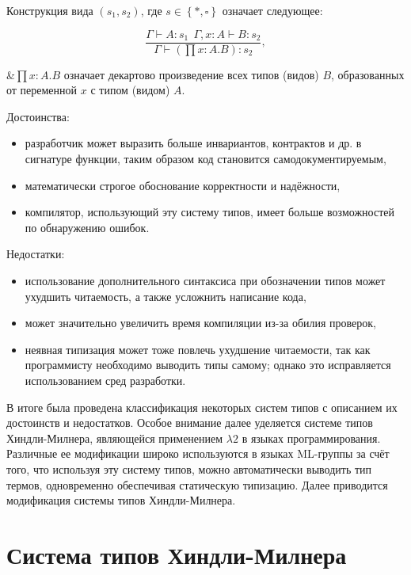 Конструкция вида $(s_1, s_2)$, где $s \in \left\{ *, \square \right\}$ означает следующее:

\begin{equation}
    \label{eq:type_system_rules}
    \frac{
        \Gamma \vdash A: s_1 ~~ \Gamma, x: A \vdash B: s_2
    }{
        \Gamma \vdash (\prod x: A. B): s_2
    },
\end{equation}
\begin{eqrem}
    &$\prod x: A. B$ означает декартово произведение всех типов (видов) $B$, образованных от переменной $x$ с типом (видом) $A$.
\end{eqrem}

Достоинства:
\begin{itemize}
    \item разработчик может выразить больше инвариантов, контрактов и др. в сигнатуре функции, таким образом код становится самодокументируемым,
    \item математически строгое обоснование корректности и надёжности,
    \item компилятор, использующий эту систему типов, имеет больше возможностей по обнаружению ошибок.
\end{itemize}

Недостатки:
\begin{itemize}
    \item использование дополнительного синтаксиса при обозначении типов может ухудшить читаемость, а также усложнить написание кода,
    \item может значительно увеличить время компиляции из-за обилия проверок,
    \item неявная типизация может тоже повлечь ухудшение читаемости, так как программисту необходимо выводить типы самому; однако это исправляется использованием сред разработки.
\end{itemize}

В итоге была проведена классификация некоторых систем типов с описанием их достоинств и недостатков.
Особое внимание далее уделяется системе типов Хиндли-Милнера, являющейся применением $\lambda 2$ в языках программирования.
Различные ее модификации широко используются в языках ML-группы за счёт того, что используя эту систему типов, можно автоматически выводить тип термов, одновременно обеспечивая статическую типизацию.
Далее приводится модификация системы типов Хиндли-Милнера.



\section{Система типов Хиндли-Милнера}
\label{sec:hindley-milner}

